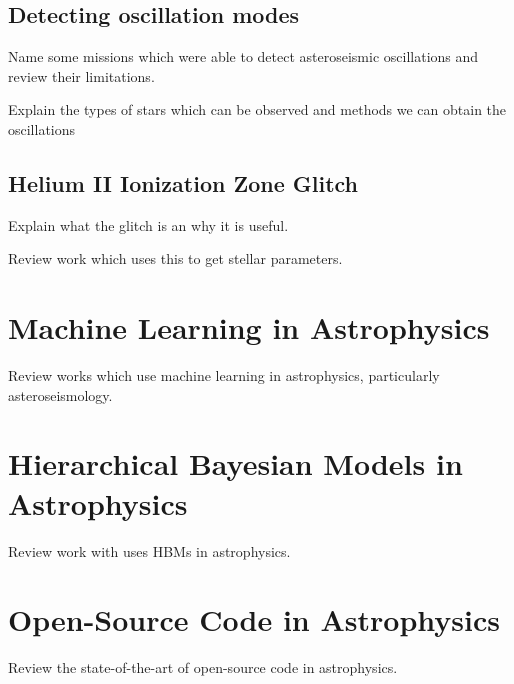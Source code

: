 \subsection{Detecting oscillation modes}

Name some missions which were able to detect asteroseismic oscillations and review their limitations.

Explain the types of stars which can be observed and methods we can obtain the oscillations

\subsection{Helium II Ionization Zone Glitch}

Explain what the glitch is an why it is useful.

Review work which uses this to get stellar parameters.

\section{Machine Learning in Astrophysics}

Review works which use machine learning in astrophysics, particularly asteroseismology.

\section{Hierarchical Bayesian Models in Astrophysics}

Review work with uses HBMs in astrophysics.

\section{Open-Source Code in Astrophysics}

Review the state-of-the-art of open-source code in astrophysics.
